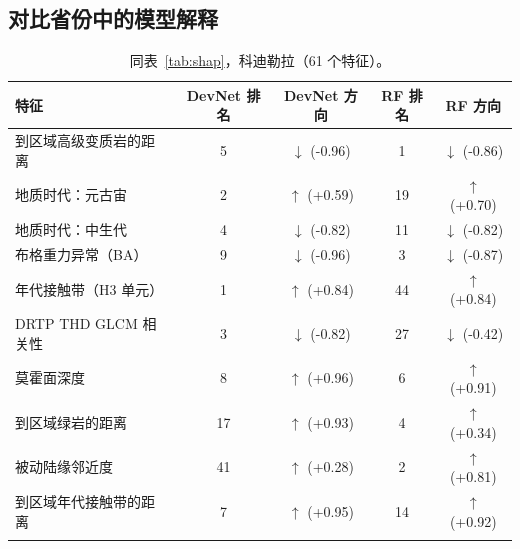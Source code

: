 \documentclass[pdflatex,sn-apa]{sn-jnl}
\begin{document}
\begin{appendices}
\clearpage
\section{对比省份中的模型解释}\label{app:shap}

\begin{table}[!h]
\caption{同表~\ref{tab:shap}，科迪勒拉（61 个特征）。}\label{tab:shap-cord}
\footnotesize
\begin{tabular*}{\textwidth}{@{\extracolsep\fill}lcccc}
\toprule
特征 & DevNet 排名 & DevNet 方向 & RF 排名 & RF 方向 \\
\midrule
到区域高级变质岩的距离 & 5 & $\downarrow$ (-0.96) & 1 & $\downarrow$ (-0.86) \\
地质时代：元古宙 & 2 & $\uparrow$ (+0.59) & 19 & $\uparrow$ (+0.70) \\
地质时代：中生代 & 4 & $\downarrow$ (-0.82) & 11 & $\downarrow$ (-0.82) \\
布格重力异常（BA） & 9 & $\downarrow$ (-0.96) & 3 & $\downarrow$ (-0.87) \\
年代接触带（H3 单元） & 1 & $\uparrow$ (+0.84) & 44 & $\uparrow$ (+0.84) \\
DRTP THD GLCM 相关性 & 3 & $\downarrow$ (-0.82) & 27 & $\downarrow$ (-0.42) \\
莫霍面深度 & 8 & $\uparrow$ (+0.96) & 6 & $\uparrow$ (+0.91) \\
到区域绿岩的距离 & 17 & $\uparrow$ (+0.93) & 4 & $\uparrow$ (+0.34) \\
被动陆缘邻近度 & 41 & $\uparrow$ (+0.28) & 2 & $\uparrow$ (+0.81) \\
到区域年代接触带的距离 & 7 & $\uparrow$ (+0.95) & 14 & $\uparrow$ (+0.92) \\
\botrule
\end{tabular*}
\end{table}


\end{appendices}
\end{document}
